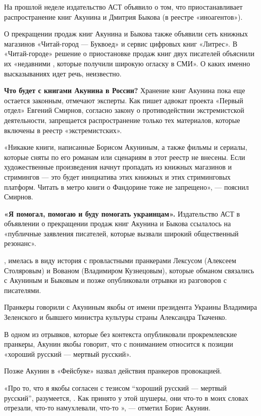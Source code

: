 На прошлой неделе издательство АСТ объявило о том,
что приостанавливает распространение книг
Акунина и Дмитрия Быкова (в реестре «иноагентов»).

О прекращении продаж книг Акунина и Быкова
также объявили сеть книжных магазинов «Читай-город — Буквоед»
и сервис цифровых книг «Литрес». В «Читай-городе» решение
о приостановке продаж книг двух писателей объяснили их
«недавними ,
которые получили широкую огласку в СМИ».
О каких именно высказываниях идет речь, неизвестно.

\textbf{Что будет с книгами Акунина в России?}
Хранение книг Акунина пока еще остается законным,
отмечают эксперты.
Как пишет адвокат проекта «Первый отдел» Евгений Смирнов,
согласно закону о противодействии экстремистской деятельности,
запрещается распространение только тех материалов,
которые включены в реестр «экстремистских».

«Никакие книги, написанные Борисом Акуниным, а также фильмы и сериалы,
которые сняты по его романам или сценариям в этот реестр не внесены.
Если художественные произведения начнут пропадать из книжных магазинов
и стримингов --- это будет инициатива этих книжных и этих
стриминговых платформ.
Читать в метро книги о Фандорине тоже не запрещено», --- пояснил Смирнов.

\textbf{«Я помогал, помогаю и буду помогать украинцам».}
Издательство АСТ в объявлении о прекращении продаж книг
Акунина и Быкова ссылалось на «публичные заявления писателей,
которые вызвали широкий общественный резонанс».

,
имелась в виду история с провластными пранкерами Лексусом
(Алексеем Столяровым) и Вованом (Владимиром Кузнецовым),
которые обманом связались с Акуниным и Быковым и позже
опубликовали отрывки из разговоров с писателями.

Пранкеры говорили с Акуниным якобы от имени президента
Украины Владимира Зеленского и бывшего министра культуры страны
Александра Ткаченко.

В одном из отрывков, которые без контекста опубликовали
прокремлевские пранкеры, Акунин якобы говорит,
что с пониманием относится к позиции
«хороший русский --- мертвый русский».

Позже Акунин в «Фейсбуке» назвал действия пранкеров провокацией.

«Про то, что я якобы согласен с тезисом ``хороший русский
--- мертвый русский'', разумеется, .
Как принято у этой шушеры, они что-то в моих словах отрезали,
что-то намухлевали, что-то »,
--- отметил Борис Акунин.

